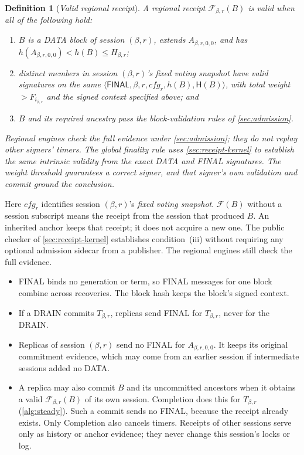 \documentclass[11pt,a4paper]{article}
\newcommand{\FC}{\mathcal F}
\newcommand{\Hash}{\mathsf H}
\newcommand{\tagg}[1]{\ensuremath{\mathsf{#1}}}
\newcommand{\defterm}[1]{\textcolor{rrBlue}{\textit{#1}}}
\newtheorem{definition}{Definition}[section]
\begin{document}
\begin{definition}[\defterm{Valid regional receipt}]
\label{def:receipt}
A regional receipt $\FC_{\beta,r}(B)$ is valid when all of the following hold:
\begin{enumerate}[label=(\roman*)]
\item $B$ is a DATA block of session $(\beta,r)$, extends
$A_{\beta,r,0,0}$, and has $h(A_{\beta,r,0,0})<h(B)\le H_{\beta,r}$;
\item distinct members in session $(\beta,r)$'s fixed voting snapshot have
valid signatures on the same
$\langle\tagg{FINAL},\beta,r,\mathit{cfg}_r,h(B),\Hash(B)\rangle$,
with total weight $>F_{i_{\beta,r}}$ and the signed context specified above; and
\item $B$ and its required ancestry pass the block-validation rules of
\cref{sec:admission}.
\end{enumerate}
Regional engines check the full evidence under \cref{sec:admission};
they do not replay other signers' timers. The global finality rule uses
\cref{sec:receipt-kernel} to establish the same intrinsic validity from
the exact DATA and FINAL signatures. The weight threshold guarantees a
correct signer, and that signer's own validation and commit ground the
conclusion.
\end{definition}
Here $\mathit{cfg}_r$ identifies session $(\beta,r)$'s \defterm{fixed
voting snapshot}. $\FC(B)$ without a session subscript means the receipt
from the session that produced $B$. An inherited anchor keeps that
receipt; it does not acquire a new one. The public checker of
\cref{sec:receipt-kernel} establishes condition~(iii) without requiring
any optional admission sidecar from a publisher. The regional engines
still check the full evidence.
\begin{itemize}
\item FINAL binds no generation or term, so FINAL messages for one block
combine across recoveries. The block hash keeps the block's signed
context.
\item If a DRAIN commits $T_{\beta,r}$, replicas send FINAL for
$T_{\beta,r}$, never for the DRAIN.
\item Replicas of session $(\beta,r)$ send no FINAL for $A_{\beta,r,0,0}$.
It keeps its original commitment evidence, which may come from an earlier
session if intermediate sessions added no DATA.
\item A replica may also commit $B$ and its uncommitted ancestors when it
obtains a valid $\FC_{\beta,r}(B)$ of its own session. Completion does
this for $T_{\beta,r}$ (\cref{alg:steady}). Such a commit sends no FINAL,
because the receipt already exists. Only Completion also cancels timers.
Receipts of other sessions serve only as history or anchor evidence;
they never change this session's locks or log.
\end{itemize}
\end{document}
